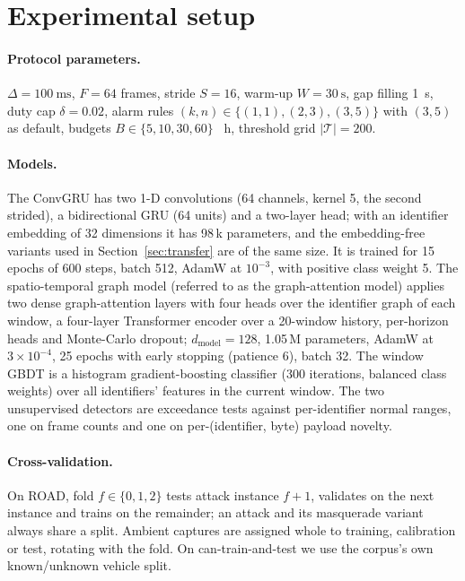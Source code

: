 \documentclass[preprint,11pt,authoryear]{elsarticle}
\begin{document}
\section{Experimental setup}
\label{sec:setup}

\paragraph{Protocol parameters.} $\Delta=\SI{100}{\milli\second}$, $F=64$ frames, stride $S=16$,
warm-up $W=\SI{30}{\second}$, gap filling \SI{1}{\second}, duty cap $\delta=0.02$, alarm rules
$(k,n)\in\{(1,1),(2,3),(3,5)\}$ with $(3,5)$ as default, budgets
$B\in\{5,10,30,60\}$ \si{\per\hour}, threshold grid $|\mathcal{T}|=200$.

\paragraph{Models.} The ConvGRU has two 1-D convolutions (64 channels, kernel 5, the second
strided), a bidirectional GRU (64 units) and a two-layer head; with an identifier embedding of 32
dimensions it has 98\,k parameters, and the embedding-free variants used in
Section~\ref{sec:transfer} are of the same size. It is trained for 15 epochs of 600 steps, batch
512, AdamW at $10^{-3}$, with positive class weight 5. The spatio-temporal graph model (referred to
as the graph-attention model) applies two dense graph-attention layers with four heads over the
identifier graph of each window, a four-layer Transformer encoder over a 20-window history,
per-horizon heads and Monte-Carlo dropout; $d_{\mathrm{model}}=128$, 1.05\,M parameters, AdamW at
$3\times10^{-4}$, 25 epochs with early stopping (patience 6), batch 32. The window GBDT is a
histogram gradient-boosting classifier (300 iterations, balanced class weights) over all
identifiers' features in the current window. The two unsupervised detectors are exceedance tests
against per-identifier normal ranges, one on frame counts and one on per-(identifier, byte) payload
novelty.

\paragraph{Cross-validation.} On ROAD, fold $f\in\{0,1,2\}$ tests attack instance $f{+}1$, validates
on the next instance and trains on the remainder; an attack and its masquerade variant always share
a split. Ambient captures are assigned whole to training, calibration or test, rotating with the
fold. On can-train-and-test we use the corpus's own known/unknown vehicle split.
\end{document}
